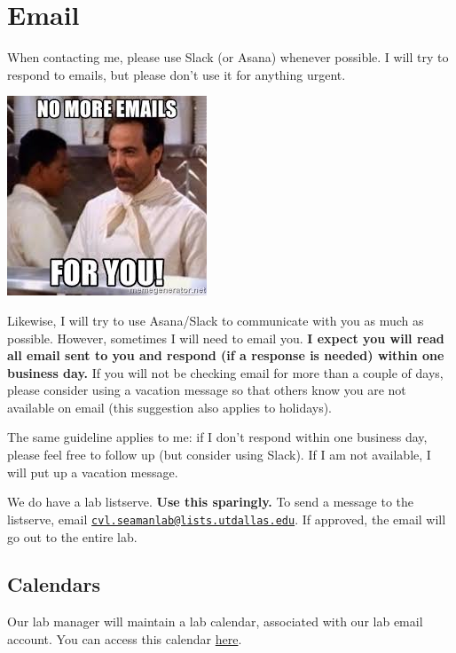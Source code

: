 \documentclass[
]{book}
\begin{document}
\hypertarget{email}{%
\section{Email}\label{email}}

When contacting me, please use Slack (or Asana) whenever possible. I will try to respond to emails, but please don't use it for anything urgent.

\includegraphics{images/email2.jpeg}

Likewise, I will try to use Asana/Slack to communicate with you as much as possible. However, sometimes I will need to email you. \textbf{I expect you will read all email sent to you and respond (if a response is needed) within one business day.} If you will not be checking email for more than a couple of days, please consider using a vacation message so that others know you are not available on email (this suggestion also applies to holidays).

The same guideline applies to me: if I don't respond within one business day, please feel free to follow up (but consider using Slack). If I am not available, I will put up a vacation message.

We do have a lab listserve. \textbf{Use this sparingly.} To send a message to the listserve, email \href{mailto:cvl.seamanlab@lists.utdallas.edu}{\nolinkurl{cvl.seamanlab@lists.utdallas.edu}}. If approved, the email will go out to the entire lab.

\hypertarget{calendars}{%
\subsection{Calendars}\label{calendars}}

Our lab manager will maintain a lab calendar, associated with our lab email account. You can access this calendar \href{https://calendar.google.com/calendar/embed?src=agingwelllab\%40gmail.com\&ctz=America\%2FNew_York}{here}.
\end{document}
